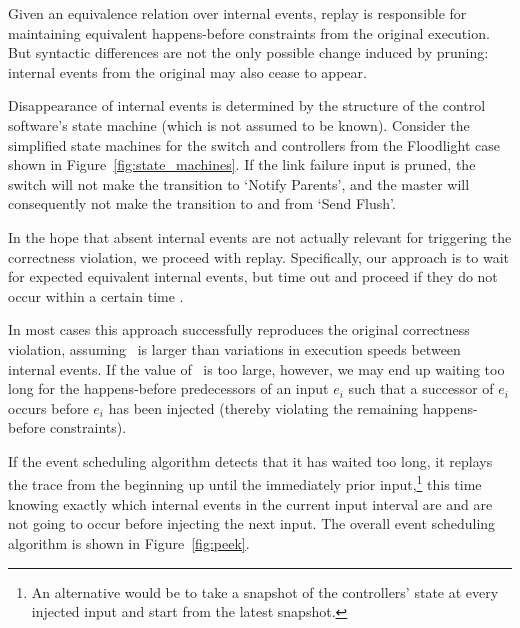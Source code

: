 Given an equivalence relation over internal events, replay
is responsible for maintaining equivalent happens-before constraints from the
original execution.
But syntactic differences are not the
only possible change induced by pruning: internal events from the original
may also cease to appear.

Disappearance of internal events is determined by the structure of the control
software's state machine (which is not assumed to be known). Consider the simplified state machines for the switch and
controllers from the Floodlight case shown in
Figure~\ref{fig:state_machines}. If the link failure input is pruned, the
switch will not make the transition to `Notify Parents', and the master will
consequently not make the transition to and from `Send Flush'.

In the hope that absent internal events are not actually relevant
for triggering the correctness violation, we proceed with replay.
Specifically, our approach is to wait for expected equivalent internal events, but time out and proceed
if they do not occur within a certain time \textepsilon.

In most cases this approach successfully reproduces the original correctness
violation, assuming \textepsilon~is larger than variations in execution speeds
between internal events. If the value of \textepsilon~is too large, however, we may end up
waiting too long for the happens-before predecessors of an input $e_i$ such that a
successor of $e_i$ occurs before $e_i$ has been injected
(thereby violating the remaining happens-before constraints).

If the event scheduling algorithm detects that it has waited too long, it
replays the trace from the beginning up until the immediately prior input,\footnote{An alternative
would be to take a snapshot of the controllers' state at every injected input
and start from the latest snapshot.} this time
knowing exactly which internal events in the current input interval are
and are not going to occur before injecting the next input. The overall event scheduling algorithm
is shown in Figure~\ref{fig:peek}.

